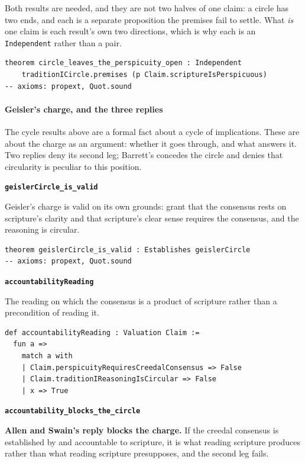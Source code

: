 \documentclass[11pt]{article}
\begin{document}
Both results are needed, and they are not two halves of one claim: a circle has two ends, and each is a separate proposition the premises fail to settle. What \emph{is} one claim is each result’s own two directions, which is why each is an \texttt{Independent} rather than a pair.

{\small\begin{verbatim}
theorem circle_leaves_the_perspicuity_open : Independent
    traditionICircle.premises (p Claim.scriptureIsPerspicuous)
-- axioms: propext, Quot.sound
\end{verbatim}}
\paragraph*{Geisler’s charge, and the three replies}
\leavevmode\par\nobreak
The cycle results above are a formal fact about a cycle of implications. These are about the charge as an argument: whether it goes through, and what answers it. Two replies deny its second leg; Barrett’s concedes the circle and denies that circularity is peculiar to this position.

\par\medskip\noindent\textbf{\texttt{geisler\allowbreak{}Circle\_\allowbreak{}is\_\allowbreak{}valid}}\par\nobreak\noindent
Geisler’s charge is valid on its own grounds: grant that the consensus rests on scripture’s clarity and that scripture’s clear sense requires the consensus, and the reasoning is circular.

{\small\begin{verbatim}
theorem geislerCircle_is_valid : Establishes geislerCircle
-- axioms: propext, Quot.sound
\end{verbatim}}
\par\medskip\noindent\textbf{\texttt{accountability\allowbreak{}Reading}}\par\nobreak\noindent
The reading on which the consensus is a product of scripture rather than a precondition of reading it.

{\small\begin{verbatim}
def accountabilityReading : Valuation Claim :=
  fun a =>
    match a with
    | Claim.perspicuityRequiresCreedalConsensus => False
    | Claim.traditionIReasoningIsCircular => False
    | x => True
\end{verbatim}}
\par\medskip\noindent\textbf{\texttt{accountability\_\allowbreak{}blocks\_\allowbreak{}the\_\allowbreak{}circle}}\par\nobreak\noindent
\textbf{Allen and Swain’s reply blocks the charge.} If the creedal consensus is established by and accountable to scripture, it is what reading scripture produces rather than what reading scripture presupposes, and the second leg fails.
\end{document}
